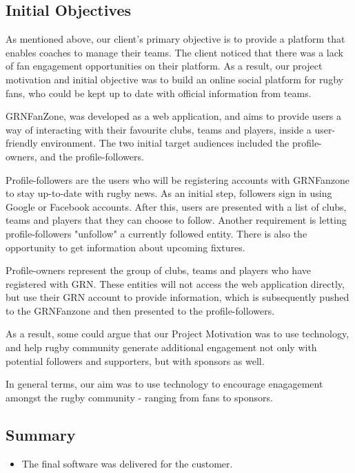 \documentclass{l3proj}
\begin{document}
\subsection{Initial Objectives}
As mentioned above, our client's primary objective is to provide a platform that
 enables coaches to manage their teams.  The client noticed that there was a lack of
 fan engagement opportunities on their platform. As a result, our project motivation 
 and initial objective was to build an online social platform for rugby fans, who could
 be kept up to date with official information from teams.

GRNFanZone, was developed as a web application, and aims to provide users a way of
 interacting with their favourite clubs, teams and players, inside a user-friendly
 environment. The two initial target audiences included the profile-owners, and the
 profile-followers.

Profile-followers are the users who will be registering accounts with GRNFanzone to
 stay up-to-date with rugby news. As an initial step, followers sign in using Google or 
 Facebook accounts. After this, users are presented with a list of clubs, teams and players
 that they can choose to follow. Another requirement is letting profile-followers "unfollow"
 a currently followed entity. There is also the opportunity to get information about 
 upcoming fixtures.

Profile-owners represent the group of clubs, teams and players who have registered with
 GRN. These entities will not access the web application directly, but use their GRN account
 to provide information, which is subsequently pushed to the GRNFanzone and then presented
 to the profile-followers.

As a result, some could argue that our Project Motivation was to use technology, and help
rugby community generate additional engagement not only with potential followers and
supporters, but with sponsors as well.

In general terms, our aim was to use technology to encourage enagagement amongst the 
 rugby community - ranging from fans to sponsors.

\subsection{Summary}
\begin{itemize}
\item The final software was delivered for the customer.
\end{itemize}
\end{document}
